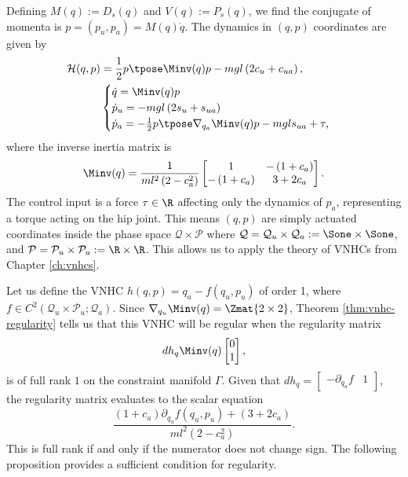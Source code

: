 Defining \(M(q) := D_s(q)\) and \(V(q) := P_s(q)\), we find the conjugate of momenta 
is \(p = (p_u, p_a) = M(q)\dot{q}\).
The dynamics in \((q,p)\) coordinates are given by
\begin{align}\label{eqn:acrobot-hamiltonian}
    \mathcal{H}(q,p) &= \frac{1}{2}p\tpose \Minv(q) p -
    mgl\left(2 c_u + c_{ua}\right)
    , \\
     &\begin{cases}
        \dot{q} = \Minv(q) p \\
        \dot{p}_u = -mgl\left(2s_u + s_{ua}\right) \\
        \dot{p}_a =-\frac{1}{2}p\tpose \nabla_{q_a}\Minv(q) p
        - mgl s_{ua} + \tau,
    \end{cases} \nonumber
\end{align}
where the inverse inertia matrix is
\begin{equation}\label{eqn:Minv}
    \Minv(q) = \frac{1}{ml^2\left(2-c_a^2\right)}
    \begin{bmatrix}
        1 &
        -\left(1+c_a\right) \\
        -\left(1+c_a\right) &
        3+2c_a
    \end{bmatrix}
    .
\end{equation}
The control input is a force \(\tau \in \R\) affecting only the dynamics of
\(p_a\), representing a torque acting on the hip joint.
This means \((q,p)\) are simply actuated coordinates inside the phase space
\(\mathcal{Q} \times \mathcal{P}\) where
\(\mathcal{Q} = \mathcal{Q}_u \times \mathcal{Q}_a 
:= \Sone \times \Sone\), and
\(\mathcal{P} = \mathcal{P}_u \times \mathcal{P}_a
:= \R \times \R\).
This allows us to apply the theory of VNHCs from Chapter
\ref{ch:vnhcs}.

Let us define the VNHC \(h(q,p) = q_a - f(q_u,p_u)\) of order 1, where
\(f \in C^2\left(\mathcal{Q}_u \times \mathcal{P}_u; \mathcal{Q}_a\right)\).
Since \(\nabla_{q_u}\Minv(q) = \Zmat{2\times 2}\),
Theorem \ref{thm:vnhc-regularity} tells us that this VNHC will be regular
when the regularity matrix
\[
    dh_q \Minv(q) \begin{bmatrix}0 \\ 1 \end{bmatrix}
    ,
\]
is of full rank \(1\) on the constraint manifold \(\Gamma\).
Given that
\(dh_q = \begin{bmatrix} -\partial_{q_u} f & 1 \end{bmatrix}\),
the regularity matrix evaluates to the scalar equation
\begin{equation}\label{eqn:regularity-matrix-acrobot}
    \frac{(1+c_a)\partial_{q_u}f(q_u,p_u) + (3+2c_a)}{ml^2(2-c_a^2)}
    .
\end{equation}
This is full rank if and only if the numerator does not
change sign.
The following proposition provides a sufficient condition for regularity.

